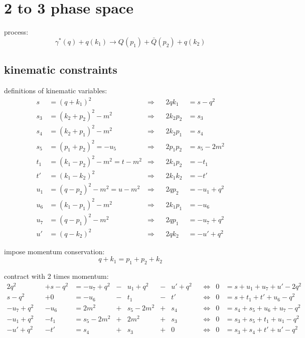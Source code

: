 \documentclass[
  ngerman,		%
  a4paper,		%
  11pt,			%
  DIV=12,		%
  parskip=half  	%
]{scrartcl}
\begin{document}
\section{2 to 3 phase space}

process:
\begin{equation}
\gamma^*(q) + q(k_1) \rightarrow Q(p_1)+\bar{Q}(p_2) + q(k_2)
\end{equation}

\subsection{kinematic constraints}

definitions of kinematic variables:
\begin{align}
s &= (q+k_1)^2 &\Rightarrow& &2qk_1 &= s-q^2\\
s_3 &= (k_2+p_2)^2-m^2  &\Rightarrow& &2k_2p_2 &= s_3\\
s_4 &= (k_2+p_1)^2-m^2  &\Rightarrow& &2k_2p_1 &= s_4\\
s_5 &= (p_1+p_2)^2 = -u_5  &\Rightarrow& &2p_1p_2 &= s_5-2m^2\\
t_1 &= (k_1-p_2)^2-m^2 = t - m^2  &\Rightarrow& &2k_1p_2 &=-t_1\\
t' &= (k_1-k_2)^2  &\Rightarrow& &2k_1k_2 &= -t'\\
u_1 &= (q-p_2)^2-m^2 = u - m^2  &\Rightarrow& &2qp_2 &=-u_1+q^2\\
u_6 &= (k_1-p_1)^2 - m^2  &\Rightarrow& &2k_1p_1 &=-u_6\\
u_7 &= (q-p_1)^2 - m^2  &\Rightarrow& &2qp_1 &=-u_7+q^2\\
u' &= (q-k_2)^2  &\Rightarrow& &2qk_2 &=-u'+q^2
\end{align}

impose momentum conservation:
\begin{equation}
q+k_1 = p_1+p_2+k_2
\end{equation}

contract with 2 times momentum:
\begin{align}
2q^2 && +s-q^2 &=-u_7+q^2 &-& u_1+q^2 &-& u'+q^2 &&\Leftrightarrow &0 &=s+u_1+u_7+u'-2q^2 \label{eq:MomCon3wq} \\
s-q^2 && +0 &= -u_6 &-& t_1 &-& t' &&\Leftrightarrow &0 &= s+t_1+t'+u_6-q^2 \label{eq:MomCon3wk1}\\
-u_7+q^2 && -u_6 &= 2m^2 &+& s_5-2m^2 &+& s_4 &&\Leftrightarrow &0 &= s_4+s_5+u_6+u_7-q^2 \label{eq:MomCon3wp1}\\
-u_1+q^2 && -t_1 &= s_5-2m^2 &+& 2m^2 &+& s_3 &&\Leftrightarrow &0 &= s_3+s_5+t_1+u_1-q^2 \label{eq:MomCon3wp2}\\
-u'+q^2 && -t' &= s_4 &+& s_3 &+& 0 &&\Leftrightarrow &0 &= s_3+s_4+t'+u'-q^2 \label{eq:MomCon3wk2}
\end{align}
\end{document}

